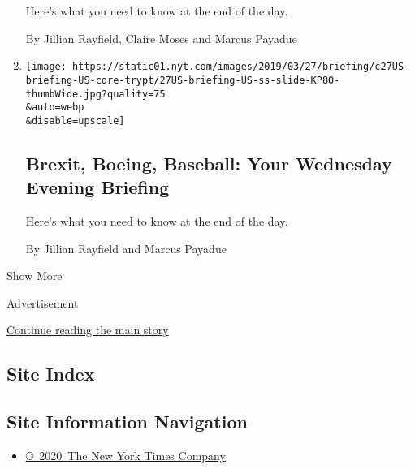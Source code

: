 \begin{enumerate}
  Here's what you need to know at the end of the day.

  By Jillian Rayfield, Claire Moses and Marcus Payadue
\item
  \href{/2019/03/27/briefing/brexit-boeing-baseball.html}{}

  \texttt{[image: https://static01.nyt.com/images/2019/03/27/briefing/c27US-briefing-US-core-trypt/27US-briefing-US-ss-slide-KP80-thumbWide.jpg?quality=75\\\&auto=webp\\\&disable=upscale]}

  \hypertarget{brexit-boeing-baseball-your-wednesday-evening-briefing}{%
  \subsection{Brexit, Boeing, Baseball: Your Wednesday Evening
  Briefing}\label{brexit-boeing-baseball-your-wednesday-evening-briefing}}

  Here's what you need to know at the end of the day.

  By Jillian Rayfield and Marcus Payadue
\end{enumerate}

Show More

Advertisement

\protect\hyperlink{after-mid2}{Continue reading the main story}

\hypertarget{site-index}{%
\subsection{Site Index}\label{site-index}}

\hypertarget{site-information-navigation}{%
\subsection{Site Information
Navigation}\label{site-information-navigation}}

\begin{itemize}
\tightlist
\item
  \href{https://help.nytimes.com/hc/en-us/articles/115014792127-Copyright-notice}{©~2020~The
  New York Times Company}
\end{itemize}

